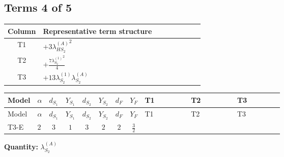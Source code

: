\documentclass[8pt]{article}
\begin{document}
\begin{landscape}
\subsection*{Terms 4 of 5}
\begin{center}
\begin{tabular}{@{}c >{\raggedright\arraybackslash}p{0.82\linewidth}@{}}
\toprule
Column & Representative term structure \\
\midrule
T1 & \(\displaystyle +3 {\lambda_{HS_2}^{(A)}}^2\) \\
\midrule
T2 & \(\displaystyle +\frac{7 {\lambda_{S_2}^{(1)}}^2}{4}\) \\
\midrule
T3 & \(\displaystyle +13 {\lambda_{S_2}^{(1)}} {\lambda_{S_2}^{(A)}}\) \\
\midrule
\bottomrule
\end{tabular}
\end{center}
\smallskip
\tiny
\begin{longtable}{@{}llcccccc >{\raggedright\arraybackslash}p{0.21\linewidth} >{\raggedright\arraybackslash}p{0.21\linewidth} >{\raggedright\arraybackslash}p{0.21\linewidth}@{}}
\toprule
Model & $\alpha$ & $d_{S_1}$ & $Y_{S_1}$ & $d_{S_2}$ & $Y_{S_2}$ & $d_F$ & $Y_F$ & T1 & T2 & T3 \\
\midrule
\endfirsthead
\toprule
Model & $\alpha$ & $d_{S_1}$ & $Y_{S_1}$ & $d_{S_2}$ & $Y_{S_2}$ & $d_F$ & $Y_F$ & T1 & T2 & T3 \\
\midrule
\endhead
T3-E & $2$ & $3$ & $1$ & $3$ & $2$ & $2$ & $\frac{3}{2}$ & \scriptsize\adjustbox{max width=\linewidth}{$\begin{gathered} +3 {\lambda_{HS_2}^{(A)}}^2\end{gathered}$} & \scriptsize\adjustbox{max width=\linewidth}{$\begin{gathered} +\frac{7 {\lambda_{S_2}^{(1)}}^2}{4}\end{gathered}$} & \scriptsize\adjustbox{max width=\linewidth}{$\begin{gathered} +13 {\lambda_{S_2}^{(1)}} {\lambda_{S_2}^{(A)}}\end{gathered}$} \\
\midrule
\bottomrule
\end{longtable}
\clearpage
\noindent\textbf{Quantity: }$\lambda_{S_2}^{(A)}$\par\smallskip

\end{landscape}
\end{document}
